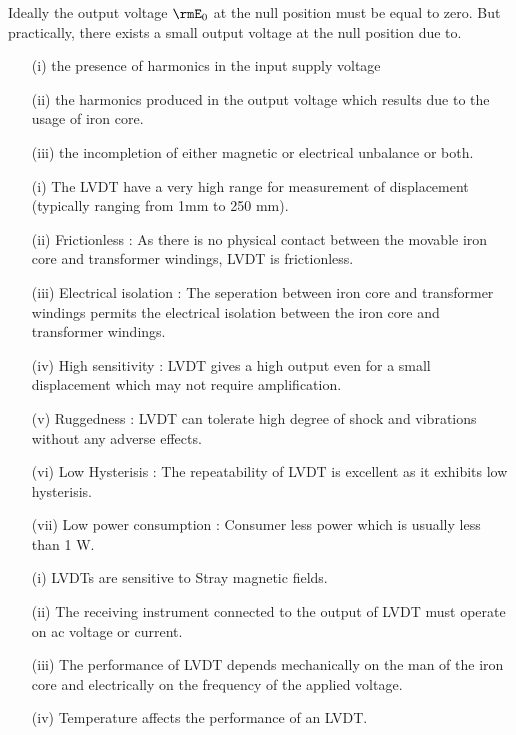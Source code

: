 \eject

Ideally the output voltage $\rmE_0$ at the null position must be equal to
zero. But practically, there exists a small output voltage at the
null position due to.
\begin{itemize}
\item[(i)] the presence of harmonics in the input supply voltage

\item[(ii)] the harmonics produced in the output voltage which
results due to the usage of iron core.

\item[(iii)] the incompletion of either  magnetic or electrical
unbalance or both.
\end{itemize}

\begin{itemize}
\item[(i)] The LVDT have a very high range for measurement of
displacement (typically ranging from 1mm to 250 mm).

\item[(ii)] Frictionless : As there is no physical contact between the
movable iron core and transformer windings, LVDT is frictionless.

\item[(iii)] Electrical isolation : The seperation between iron core
and transformer windings permits the electrical isolation between the
iron core and transformer windings. 

\item[(iv)] High sensitivity : LVDT gives a high output even for a
small displacement which may not require amplification.

\item[(v)] Ruggedness : LVDT can tolerate high degree of shock and
vibrations without any adverse effects.

\item[(vi)] Low Hysterisis : The repeatability of LVDT is excellent as
it exhibits low hysterisis.

\item[(vii)] Low power consumption : Consumer less power which is
usually less than 1 W.
\end{itemize}


\begin{itemize}
\item[(i)] LVDTs are sensitive to Stray magnetic fields.

\item[(ii)] The receiving instrument connected to the output of LVDT
must operate on ac voltage or current.

\item[(iii)] The performance of LVDT depends mechanically on the man
of the iron core and electrically on the frequency of the applied voltage.

\item[(iv)] Temperature affects the performance of an LVDT.
\end{itemize}

